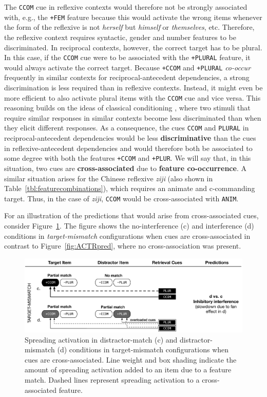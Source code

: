 \documentclass{cambridge7A}\usepackage[]{graphicx}\usepackage[]{color}
\newcommand{\actrcue}[1]{\texttt{\uppercase{#1}}}
\newcommand{\match}[1]{\texttt{+\uppercase{#1}}}
\begin{document}
{The \actrcue{CCOM} cue in reflexive contexts would therefore not be strongly associated with, e.g., the \match{FEM} feature because this would activate the wrong items whenever the form of the reflexive is not \textit{herself} but \textit{himself} or \textit{themselves}, etc. Therefore, the reflexive context requires syntactic, gender and number features to be discriminated.
In reciprocal contexts, however, the correct target has to be plural. In this case, if the \actrcue{CCOM} cue were to be associated with the \match{PLURAL} feature, it would always activate the correct target. 
Because \match{CCOM} and \match{PLURAL} \emph{co-occur} frequently in similar contexts for reciprocal-antecedent dependencies, a strong discrimination is less required than in reflexive contexts. Instead, it might even be more efficient to also activate plural items with the \actrcue{ccom} cue and vice versa. 
This reasoning builds on the ideas of classical conditioning \citep{RescorlaWagner1972}, where two stimuli that require similar responses in similar contexts become less discriminated than when they elicit different responses.
As a consequence, the cues \actrcue{ccom} and \actrcue{plural} in reciprocal-antecedent dependencies would be less \textbf{discriminative} than the cues in reflexive-antecedent dependencies and would therefore both be associated to some degree with both the features \match{ccom} and \match{plur}. We will say that, in this situation, two cues are \textbf{cross-associated} due to \textbf{feature co-occurrence}.
}
A similar situation arises for the Chinese reflexive \textit{ziji} (also shown in Table~\ref{tbl:featurecombinations}), which requires an animate and c-commanding target. Thus, in the case of \textit{ziji}, \actrcue{ccom} would be cross-associated with \actrcue{anim}.


For an illustration of the predictions that would arise from cross-associated cues, consider Figure~\ref{fig:newmodelcueconf}. The figure shows the no-interference (c) and interference (d) conditions in \emph{target-mismatch} configurations when cues are cross-associated in contrast to Figure~\ref{fig:ACTRpred}, where no cross-association was present.

\begin{figure}[!htbp]
\includegraphics[width=\textwidth]{figures/tableNewmodelcueconf}
	\caption{Spreading activation in distractor-match (c) and distractor-mismatch (d) conditions in target-mismatch configurations when cues are cross-associated. Line weight and box shading indicate the amount of spreading activation added to an item due to a feature match. Dashed lines represent spreading activation to a cross-associated feature.}
	\label{fig:newmodelcueconf}
\end{figure}
\end{document}
